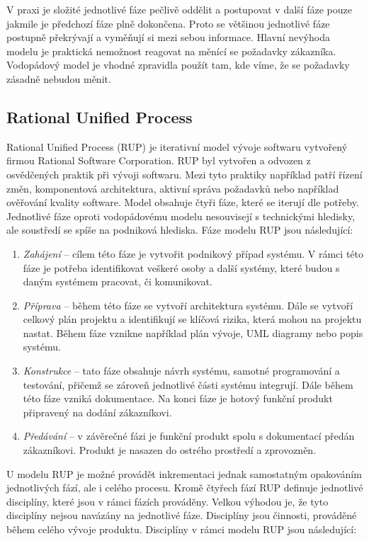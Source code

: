 \documentclass[czech,master]{diploma}
\begin{document}
V praxi je složité jednotlivé fáze pečlivě oddělit a postupovat v další fáze pouze jakmile je předchozí fáze plně dokončena. Proto se většinou jednotlivé fáze postupně překrývají a vyměňují si mezi sebou informace. Hlavní nevýhoda modelu je praktická nemožnost reagovat na měnící se požadavky zákazníka. Vodopádový model je vhodné zpravidla použít tam, kde víme, že se požadavky zásadně nebudou měnit.

\subsection{Rational Unified Process}
Rational Unified Process (RUP) je iterativní model vývoje softwaru vytvořený firmou Rational Software Corporation. RUP byl vytvořen a odvozen z osvědčených praktik při vývoji softwaru. Mezi tyto praktiky například patří řízení změn, komponentová architektura, aktivní správa požadavků nebo například ověřování kvality software. Model obsahuje čtyři fáze, které se iterují dle potřeby. Jednotlivé fáze oproti vodopádovému modelu nesouvisejí s technickými hledisky, ale soustředí se spíše na podniková hlediska. \cite{ref:rup_ibm_about} Fáze modelu RUP jsou následující:

\begin{enumerate}
\item \textit{Zahájení} -- cílem této fáze je vytvořit podnikový případ systému. V rámci této fáze je potřeba identifikovat veškeré osoby a další systémy, které budou s daným systémem pracovat, či komunikovat.
\item \textit{Příprava} -- během této fáze se vytvoří architektura systému. Dále se vytvoří celkový plán projektu a identifikují se klíčová rizika, která mohou na projektu nastat. Během fáze vznikne například plán vývoje, UML diagramy nebo popis systému.
\item \textit{Konstrukce} -- tato fáze obsahuje návrh systému, samotné programování a testování, přičemž se zároveň jednotlivé části systému integrují. Dále během této fáze vzniká dokumentace. Na konci fáze je hotový funkční produkt připravený na dodání zákazníkovi.
\item \textit{Předávání} -- v závěrečné fázi je funkční produkt spolu s dokumentací předán zákazníkovi. Produkt je nasazen do ostrého prostředí a zprovozněn.
\end{enumerate}

U modelu RUP je možné provádět inkrementaci jednak samostatným opakováním jednotlivých fází, ale i celého procesu. Kromě čtyřech fází RUP definuje jednotlivé disciplíny, které jsou v rámci fázích prováděny. Velkou výhodou je, že tyto disciplíny nejsou navázány na jednotlivé fáze. Disciplíny jsou činnosti, prováděné během celého vývoje produktu. Disciplíny v rámci modelu RUP jsou následující:
\end{document}
